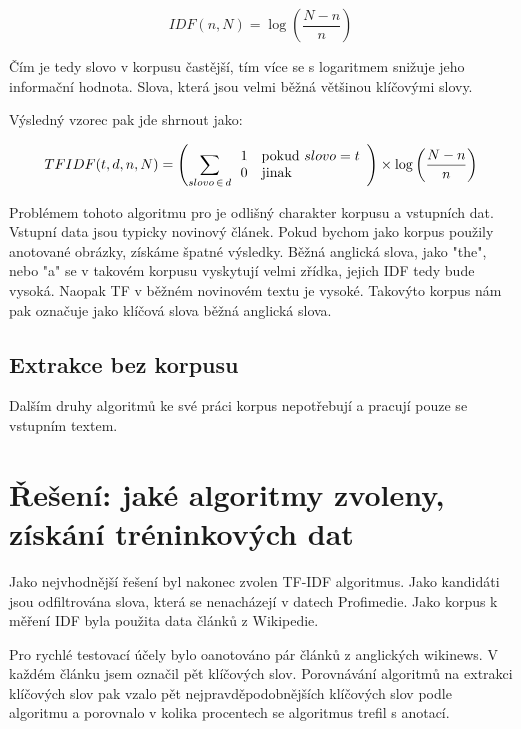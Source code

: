 \begin{equation}
IDF(n,N) = \log \left(\frac{N - n}{n}\right)
\end{equation}

Čím je tedy slovo v korpusu častější, tím více se s logaritmem snižuje jeho informační hodnota. Slova, která jsou velmi běžná většinou klíčovými slovy.

Výsledný vzorec pak jde shrnout jako:

\begin{equation}
TFIDF(t,d,n,N)= \left(\sum_{slovo\,\in\,d} \begin{array}{l l} 1 & \mathrm{pokud}\ slovo = t \\
  0 & \mathrm{jinak} \end{array}\right)
  \times
  \log \left(\frac{N - n}{n}\right)
\end{equation}

Problémem tohoto algoritmu pro je odlišný charakter korpusu a vstupních dat. Vstupní data jsou typicky novinový článek. Pokud bychom jako korpus použily anotované obrázky, získáme špatné výsledky. Běžná anglická slova, jako "the", nebo "a" se v takovém korpusu vyskytují velmi zřídka, jejich IDF tedy bude vysoká. Naopak TF v běžném novinovém textu je vysoké. Takovýto korpus nám pak označuje jako klíčová slova běžná anglická slova.


\subsection{Extrakce bez korpusu}

Dalším druhy algoritmů ke své práci korpus nepotřebují a pracují pouze se vstupním textem.

\section{Řešení: jaké algoritmy zvoleny, získání tréninkových dat}

Jako nejvhodnější řešení byl nakonec zvolen TF-IDF algoritmus. Jako kandidáti jsou odfiltrována slova, která se nenacházejí v datech Profimedie. Jako korpus k měření IDF byla použita data článků z Wikipedie.

Pro rychlé testovací účely bylo oanotováno pár článků z anglických wikinews. V každém článku jsem označil pět klíčových slov. Porovnávání algoritmů na extrakci klíčových slov pak vzalo pět nejpravděpodobnějších klíčových slov podle algoritmu a porovnalo v kolika procentech se algoritmus trefil s anotací.


